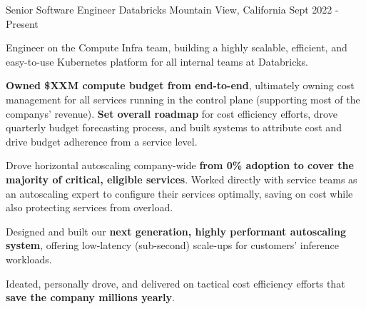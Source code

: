 

\begin{cventries}


\cventry
{Senior Software Engineer}
{\acvHeaderIconSep Databricks}
{Mountain View, California}
{Sept 2022 - Present}
{
	\begin{cvitems}
		\item Engineer on the Compute Infra team, building a highly scalable, efficient, and easy-to-use Kubernetes platform for all internal teams at Databricks.
		\item \textbf{Owned \$XXM compute budget from end-to-end}, ultimately owning cost management for all services running in the control plane (supporting most of the companys' revenue). \textbf{Set overall roadmap} for cost efficiency efforts, drove quarterly budget forecasting process, and built systems to attribute cost and drive budget adherence from a service level. 
		\item Drove horizontal autoscaling company-wide \textbf{from 0\% adoption to cover the majority of critical, eligible services}. Worked directly with service teams as an autoscaling expert to configure their services optimally, saving on cost while also protecting services from overload. 
		\item Designed and built our \textbf{next generation, highly performant autoscaling system}, offering low-latency (sub-second) scale-ups for customers' inference workloads. 
		\item Ideated, personally drove, and delivered on tactical cost efficiency efforts that \textbf{save the company millions yearly}. 
	\end{cvitems}
}


\end{cventries}
